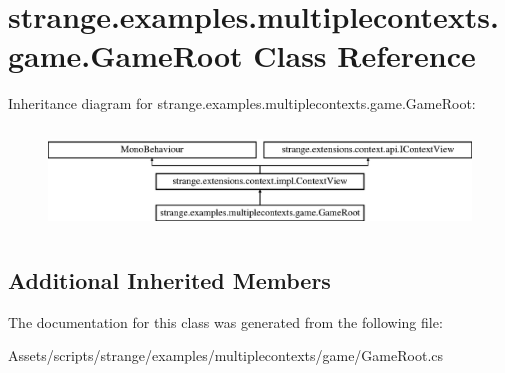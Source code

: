 \hypertarget{classstrange_1_1examples_1_1multiplecontexts_1_1game_1_1_game_root}{\section{strange.\-examples.\-multiplecontexts.\-game.\-Game\-Root Class Reference}
\label{classstrange_1_1examples_1_1multiplecontexts_1_1game_1_1_game_root}
}
Inheritance diagram for strange.\-examples.\-multiplecontexts.\-game.\-Game\-Root\-:\begin{figure}[H]
\begin{center}
\leavevmode
\includegraphics[height=2.754098cm]{classstrange_1_1examples_1_1multiplecontexts_1_1game_1_1_game_root}
\end{center}
\end{figure}
\subsection*{Additional Inherited Members}


The documentation for this class was generated from the following file\-:\begin{DoxyCompactItemize}
\item 
Assets/scripts/strange/examples/multiplecontexts/game/Game\-Root.\-cs\end{DoxyCompactItemize}
